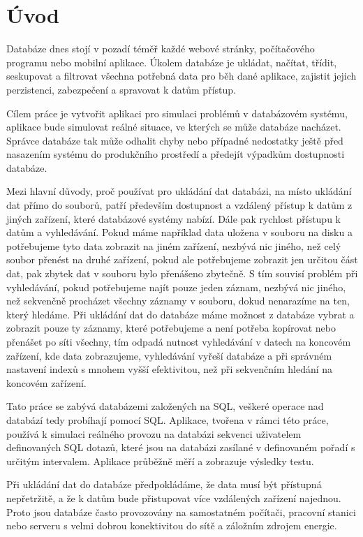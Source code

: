 \documentclass[czech,bachelor,public,dept460,male,cpdeclaration,twoside]{diploma}
\begin{document}
\MakeTitlePages


\section{Úvod}
Databáze dnes stojí v pozadí téměř každé webové stránky, počítačového programu nebo mobilní aplikace. Úkolem databáze je ukládat, načítat, třídit, seskupovat a filtrovat všechna potřebná data pro běh dané aplikace, zajistit jejich perzistenci, zabezpečení a spravovat k datům přístup. \par
Cílem práce je vytvořit aplikaci pro simulaci problémů v databázovém systému, aplikace bude simulovat reálné situace, ve kterých se může databáze nacházet. Správce databáze tak může odhalit chyby nebo případné nedostatky ještě před nasazením systému do produkčního prostředí a předejít výpadkům dostupnosti databáze. \par
Mezi hlavní důvody, proč používat pro ukládání dat databázi, na místo ukládání dat přímo do souborů, patří především dostupnost a vzdálený přístup k datům z jiných zařízení, které databázové systémy nabízí. Dále pak rychlost přístupu k datům a vyhledávání. Pokud máme například data uložena v souboru na disku a potřebujeme tyto data zobrazit na jiném zařízení, nezbývá nic jiného, než celý soubor přenést na druhé zařízení, pokud ale potřebujeme zobrazit jen určitou část dat, pak zbytek dat v souboru bylo přenášeno zbytečně. S tím souvisí problém při vyhledávání, pokud potřebujeme najít pouze jeden záznam, nezbývá nic jiného, než sekvenčně procházet všechny záznamy v souboru, dokud nenarazíme na ten, který hledáme. Při ukládání dat do databáze máme možnost z databáze vybrat a zobrazit pouze ty záznamy, které potřebujeme a není potřeba kopírovat nebo přenášet po síti všechny, tím odpadá nutnost vyhledávání v datech na koncovém zařízení, kde data zobrazujeme, vyhledávání vyřeší databáze a při správném nastavení indexů s mnohem vyšší efektivitou, než při sekvenčním hledání na koncovém zařízení. \par
Tato práce se zabývá databázemi založených na SQL, veškeré operace nad databází tedy probíhají pomocí SQL. Aplikace, tvořena v rámci této práce, používá k simulaci reálného provozu na databázi sekvenci uživatelem definovaných SQL dotazů, které jsou na databázi zasílané v definovaném pořadí s určitým intervalem. Aplikace průběžně měří a zobrazuje výsledky testu.\par
Při ukládání dat do databáze předpokládáme, že data musí být přístupná nepřetržitě, a že k datům bude přistupovat více vzdálených zařízení najednou. Proto jsou databáze často provozovány na samostatném počítači, pracovní stanici nebo serveru s velmi dobrou konektivitou do sítě a záložním zdrojem energie.
\end{document}
